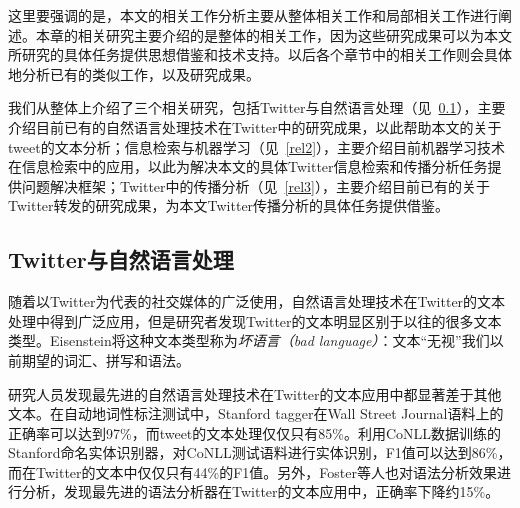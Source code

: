 这里要强调的是，本文的相关工作分析主要从整体相关工作和局部相关工作进行阐述。本章的相关研究主要介绍的是整体的相关工作，因为这些研究成果可以为本文所研究的具体任务提供思想借鉴和技术支持。以后各个章节中的相关工作则会具体地分析已有的类似工作，以及研究成果。

我们从整体上介绍了三个相关研究，包括Twitter与自然语言处理（见~\ref{rel1}），主要介绍目前已有的自然语言处理技术在Twitter中的研究成果，以此帮助本文的关于tweet的文本分析；信息检索与机器学习（见~\ref{rel2}），主要介绍目前机器学习技术在信息检索中的应用，以此为解决本文的具体Twitter信息检索和传播分析任务提供问题解决框架；Twitter中的传播分析（见~\ref{rel3}），主要介绍目前已有的关于Twitter转发的研究成果，为本文Twitter传播分析的具体任务提供借鉴。

\subsection{Twitter与自然语言处理}
\label{rel1}
随着以Twitter为代表的社交媒体的广泛使用，自然语言处理技术在Twitter的文本处理中得到广泛应用，但是研究者发现Twitter的文本明显区别于以往的很多文本类型。Eisenstein将这种文本类型称为\emph{坏语言（bad language）}：文本“无视”我们以前期望的词汇、拼写和语法。

研究人员发现最先进的自然语言处理技术在Twitter的文本应用中都显著差于其他文本。在自动地词性标注测试中，Stanford tagger在Wall Street Journal语料上的正确率可以达到97\%，而tweet的文本处理仅仅只有85\%。利用CoNLL数据训练的Stanford命名实体识别器，对CoNLL测试语料进行实体识别，F1值可以达到86\%，而在Twitter的文本中仅仅只有44\%的F1值。另外，Foster等人也对语法分析效果进行分析，发现最先进的语法分析器在Twitter的文本应用中，正确率下降约15\%。

